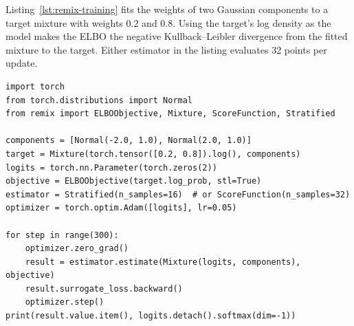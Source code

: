 \noindent\begin{minipage}{\linewidth}
Listing~\ref{lst:remix-training} fits the weights of two Gaussian components
to a target mixture with weights $0.2$ and $0.8$. Using the target's log
density as the model makes the ELBO the negative Kullback--Leibler divergence
from the fitted mixture to the target. Either estimator in the listing
evaluates 32 points per update.

\begin{lstlisting}[style=remixpython,caption={Fitting mixture weights at a matched sampling budget.},label={lst:remix-training}]
import torch
from torch.distributions import Normal
from remix import ELBOObjective, Mixture, ScoreFunction, Stratified

components = [Normal(-2.0, 1.0), Normal(2.0, 1.0)]
target = Mixture(torch.tensor([0.2, 0.8]).log(), components)
logits = torch.nn.Parameter(torch.zeros(2))
objective = ELBOObjective(target.log_prob, stl=True)
estimator = Stratified(n_samples=16)  # or ScoreFunction(n_samples=32)
optimizer = torch.optim.Adam([logits], lr=0.05)

for step in range(300):
    optimizer.zero_grad()
    result = estimator.estimate(Mixture(logits, components), objective)
    result.surrogate_loss.backward()
    optimizer.step()
print(result.value.item(), logits.detach().softmax(dim=-1))
\end{lstlisting}
\end{minipage}\par

